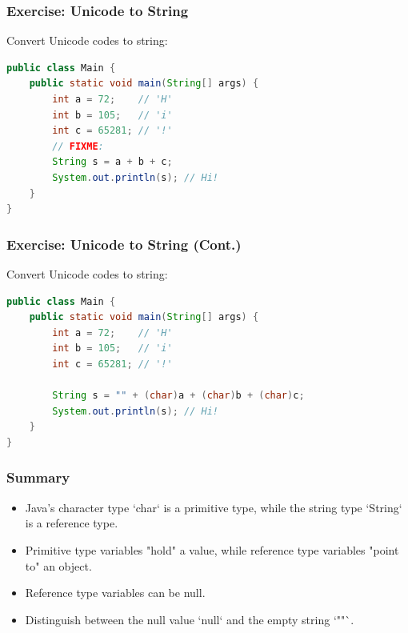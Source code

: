 \documentclass[serif, aspectratio=169]{beamer}
\begin{document}
\begin{frame}[fragile]
\frametitle{Exercise: Unicode to String}
Convert Unicode codes to string:
\begin{lstlisting}[language=Java]
public class Main {
    public static void main(String[] args) {
        int a = 72;    // 'H'
        int b = 105;   // 'i'
        int c = 65281; // '!'
        // FIXME:
        String s = a + b + c;
        System.out.println(s); // Hi!
    }
}
\end{lstlisting}
\end{frame}

\begin{frame}[fragile]
\frametitle{Exercise: Unicode to String (Cont.)}
Convert Unicode codes to string:
\begin{lstlisting}[language=Java]
public class Main {
    public static void main(String[] args) {
        int a = 72;    // 'H'
        int b = 105;   // 'i'
        int c = 65281; // '!'
        
        String s = "" + (char)a + (char)b + (char)c;
        System.out.println(s); // Hi!
    }
}
\end{lstlisting}
\end{frame}

\begin{frame}[fragile]
\frametitle{Summary}
\begin{itemize}
    \item Java's character type `char` is a primitive type, while the string type `String` is a reference type.
    \item Primitive type variables "hold" a value, while reference type variables "point to" an object.
    \item Reference type variables can be null.
    \item Distinguish between the null value `null` and the empty string `""`.
\end{itemize}
\end{frame}
\end{document}
